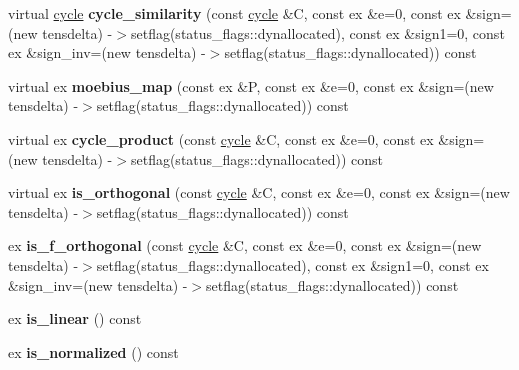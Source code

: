 \begin{DoxyCompactItemize}
virtual \mbox{\hyperlink{class_moeb_inv_1_1cycle}{cycle}} {\bfseries cycle\+\_\+similarity} (const \mbox{\hyperlink{class_moeb_inv_1_1cycle}{cycle}} \&C, const ex \&e=0, const ex \&sign=(new tensdelta) -\/$>$setflag(status\+\_\+flags\+::dynallocated), const ex \&sign1=0, const ex \&sign\+\_\+inv=(new tensdelta) -\/$>$setflag(status\+\_\+flags\+::dynallocated)) const
\item 
\mbox{\label{class_moeb_inv_1_1cycle_aec17175f191a94d6654a69073ca6a864}} 
virtual ex {\bfseries moebius\+\_\+map} (const ex \&P, const ex \&e=0, const ex \&sign=(new tensdelta) -\/$>$setflag(status\+\_\+flags\+::dynallocated)) const
\item 
\mbox{\label{class_moeb_inv_1_1cycle_adbaf9c9cbde860cbfefcb89fa0f873d5}} 
virtual ex {\bfseries cycle\+\_\+product} (const \mbox{\hyperlink{class_moeb_inv_1_1cycle}{cycle}} \&C, const ex \&e=0, const ex \&sign=(new tensdelta) -\/$>$setflag(status\+\_\+flags\+::dynallocated)) const
\item 
\mbox{\label{class_moeb_inv_1_1cycle_ab76631c75b0a092cc3bd5959f5a45a99}} 
virtual ex {\bfseries is\+\_\+orthogonal} (const \mbox{\hyperlink{class_moeb_inv_1_1cycle}{cycle}} \&C, const ex \&e=0, const ex \&sign=(new tensdelta) -\/$>$setflag(status\+\_\+flags\+::dynallocated)) const
\item 
\mbox{\label{class_moeb_inv_1_1cycle_a2c94a9eda34309d9ff2baa11e98dcffb}} 
ex {\bfseries is\+\_\+f\+\_\+orthogonal} (const \mbox{\hyperlink{class_moeb_inv_1_1cycle}{cycle}} \&C, const ex \&e=0, const ex \&sign=(new tensdelta) -\/$>$setflag(status\+\_\+flags\+::dynallocated), const ex \&sign1=0, const ex \&sign\+\_\+inv=(new tensdelta) -\/$>$setflag(status\+\_\+flags\+::dynallocated)) const
\item 
\mbox{\label{class_moeb_inv_1_1cycle_ae932ea0e679982cb9a8913002705dc4d}} 
ex {\bfseries is\+\_\+linear} () const
\item 
\mbox{\label{class_moeb_inv_1_1cycle_a428d54de886680e1aea3b93bb6da259a}} 
ex {\bfseries is\+\_\+normalized} () const
\item 
\mbox{\label{class_moeb_inv_1_1cycle_a3dea21b462eb2ccc321716c2c23f6409}} 

\end{DoxyCompactItemize}
